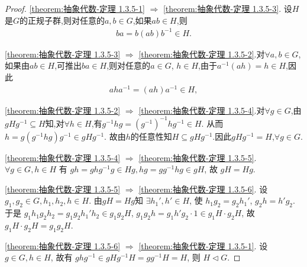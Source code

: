 \documentclass[../../main.tex]{subfiles}%
\begin{document}
\begin{proof}

\ref{theorem:抽象代数-定理 1.3.5-1} $\Rightarrow$ \ref{theorem:抽象代数-定理 1.3.5-3}. 设$H$是$G$的正规子群,则对任意的$a,b\in G$,如果$ab\in H$,则
\begin{align*}
ba = b(ab)b^{-1}\in H.
\end{align*}

\ref{theorem:抽象代数-定理 1.3.5-3} $\Rightarrow$ \ref{theorem:抽象代数-定理 1.3.5-2}.对$\forall a,b\in G$,如果由$ab\in H$,可推出$ba\in H$,则对任意的$a\in G$,
$h\in H$,由于$a^{-1}(ah)=h\in H$,因此
\begin{align*}
aha^{-1} = (ah)a^{-1}\in H,
\end{align*}

\ref{theorem:抽象代数-定理 1.3.5-2} $\Rightarrow$ \ref{theorem:抽象代数-定理 1.3.5-4}.对$\forall g\in G$,由$gHg^{-1}\subseteq H$知,对$\forall h\in H$,有$g^{-1}hg=\left( g^{-1} \right) ^{-1}hg^{-1}\in H.$
从而$h=g\left( g^{-1}hg \right) g^{-1}\in gHg^{-1}.$
故由$h$的任意性知$H\subseteq gHg^{-1}$.因此$gHg^{-1}=H$,$\forall g\in G$.

\ref{theorem:抽象代数-定理 1.3.5-4} $\Rightarrow$ \ref{theorem:抽象代数-定理 1.3.5-5}.  \( \forall g \in G, h \in H \) 有 \( gh = ghg^{-1}g \in Hg, hg = gg^{-1}hg \in gH \), 故 \( gH = Hg \).

\ref{theorem:抽象代数-定理 1.3.5-5} $\Rightarrow$ \ref{theorem:抽象代数-定理 1.3.5-6}. 设 \( g_1, g_2 \in G, h_1, h_2, h \in H \). 由$gH=Hg$知 \( \exists h_1', h' \in H \), 使 \( h_1g_2 = g_2h_1' \), \( g_2h = h'g_2 \). 于是 \( g_1h_1g_2h_2 = g_1g_2h_1'h_2 \in g_1g_2H \), \( g_1g_2h = g_1h'g_2 \cdot 1 \in g_1H \cdot g_2H \), 故 \( g_1H \cdot g_2H = g_1g_2H \).

\ref{theorem:抽象代数-定理 1.3.5-6} $\Rightarrow$ \ref{theorem:抽象代数-定理 1.3.5-1}. 设 \( g \in G, h \in H \), 故有 \( ghg^{-1} \in gHg^{-1}H = gg^{-1}H = H \), 则 \( H \lhd  G \).
\end{proof}
\end{document}
